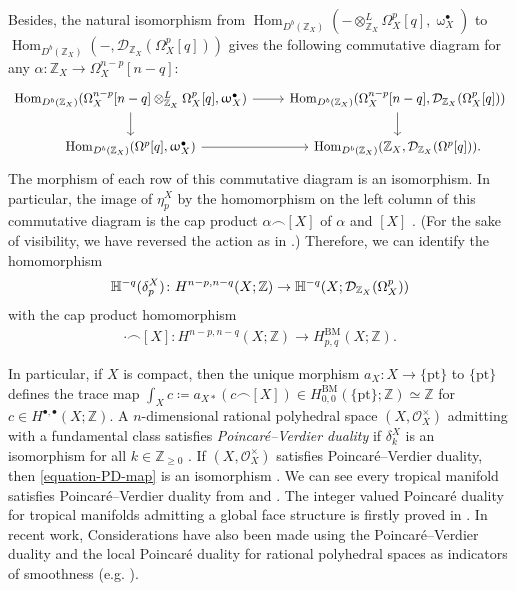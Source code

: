 \documentclass[a4paper,dvipdfmx,reqno,12pt]{amsart}
\theoremstyle{definition}
\newcommand{\deq}{\coloneqq}
\newcommand{\opn}[1]{\operatorname{#1}}
\numberwithin{equation}{section}
\begin{document}
Besides, the natural isomorphism from
$\opn{Hom}_{D^{b}(\mathbb{Z}_X)}(- 
\otimes^{L}_{\mathbb{Z}_X} \Omega_X^{p}[q],
\upomega_X^{\bullet})$ to 
$\opn{Hom}_{D^{b}(\mathbb{Z}_X)}(-,
\mathcal{D}_{\mathbb{Z}_X}(\Omega_X^{p}[q]))$
gives the following commutative diagram
for any $\alpha \colon \mathbb{Z}_X\to \Omega_X^{n-p}[n-q]$:
\[\begin{tikzcd}
{\opn{Hom}_{D^{b}(\mathbb{Z}_X)}(\Omega_X^{n-p}[n-q]
\otimes^{L}_{\mathbb{Z}_X} \Omega_X^{p}[q]
,\upomega_X^{\bullet})} & 
{\opn{Hom}_{D^{b}(\mathbb{Z}_X)}
(\Omega_X^{n-p}[n-q],\mathcal{D}_{\mathbb{Z}_X}(\Omega_X^{p}[q]))} \\
{\opn{Hom}_{D^{b}(\mathbb{Z}_X)}(\Omega^{p}[q],
\upomega_X^{\bullet})} & {\opn{Hom}_{D^{b}(\mathbb{Z}_X)}(\mathbb{Z}_X,\mathcal{D}_{\mathbb{Z}_X}(\Omega^{p}[q]))}.
	\arrow[from=1-2, to=2-2]
	\arrow[from=2-1, to=2-2]
	\arrow[from=1-1, to=1-2]
	\arrow[from=1-1, to=2-1]
\end{tikzcd}\]
The morphism of each row of
this commutative diagram is an isomorphism.
In particular,
the image of $\eta^X_{p}$ by the homomorphism
on the left column of this commutative diagram
is the cap product $\alpha\frown [X]$
of $\alpha$ and $[X]$ \cite[]{MR4637248}.
(For the sake of visibility, we have reversed 
the action as in \cite[]{MR4637248}.)
Therefore, we can identify
the homomorphism
\begin{align}
\mathbb{H}^{-q}(\delta_p^{X})
\colon H^{n-p,n-q}(X;\mathbb{Z})
\to \mathbb{H}^{-q}(X;\mathcal{D}_{\mathbb{Z}_X}
(\Omega_X^{p})) \notag
\end{align}
with the cap product homomorphism
\begin{align}
\label{equation-PD-map}
\cdot \frown [X]
\colon H^{n-p,n-q}(X;\mathbb{Z})
\to
H^{\mathrm{BM}}_{p,q}(X;\mathbb{Z}).
\end{align}

In particular, if $X$ is compact,
then the unique morphism 
$a_X\colon X\to \{\mathrm{pt}\}$
to $\{\mathrm{pt}\}$
defines the trace map
$\int_X c\deq a_{X*}(c\frown [X])\in 
H_{0,0}^{\mathrm{BM}}(\{\mathrm{pt}\};\mathbb{Z})
\simeq \mathbb{Z}$ for
$c\in H^{\bullet,\bullet}(X;\mathbb{Z})$.
A $n$-dimensional rational polyhedral space
$(X,\mathcal{O}_X^{\times})$
admitting with a fundamental class satisfies
\emph{Poincar\'e--Verdier duality} if 
$\delta_{k}^{X}$ is an isomorphism for all
$k\in \mathbb{Z}_{\geq 0}$
\cite[Definition 6.4]{MR4637248}.
If $(X,\mathcal{O}_X^{\times})$ satisfies 
Poincar\'e--Verdier duality, then
\cref{equation-PD-map} is an isomorphism
\cite[Coroolary 6.9]{MR4637248}.
We can see every tropical manifold
satisfies Poincar\'e--Verdier duality
from \cite[Proposition 5.5]{MR3894860} and
\cite[Theorem 6.7]{MR4637248}.
The integer valued Poincar\'e duality for tropical manifolds
admitting a global face structure is firstly proved in
\cite[Theorem 5.3]{MR3894860}.
In recent work,
Considerations have also been made using the Poincar\'e--Verdier duality
and the local Poincar\'e duality for rational polyhedral
spaces as indicators of smoothness
(e.g. \cite{MR4626316,amini2021homology,MR4246795}). 
\end{document}
